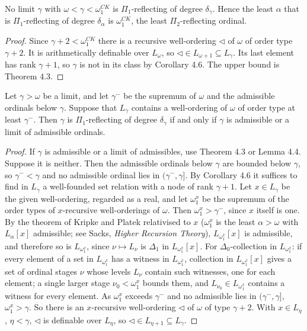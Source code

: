 \documentclass[11pt]{article}
\begin{document}
\begin{statement} No limit $\gamma$ with $\omega < \gamma <
\omega_1^{CK}$ is $\Pi_1$-reflecting of degree $\delta_\gamma$. Hence the least $\alpha$ that is $\Pi_1$-reflecting of
degree $\delta_\alpha$ is $\omega_1^{CK}$, the least $\Pi_2$-reflecting ordinal.
\end{statement}

\begin{proof}
Since $\gamma + 2 < \omega_1^{CK}$ there is a recursive well-ordering $\lhd$ of $\omega$ of order type $\gamma + 2$. It
is arithmetically definable over $L_\omega$, so $\lhd \in L_{\omega+1} \subseteq L_\gamma$. Its last element has rank
$\gamma+1$, so $\gamma$ is not in its class by Corollary 4.6. The upper bound is Theorem 4.3.
\end{proof}

\begin{statement} Let $\gamma > \omega$ be a limit, and let $\gamma^-$
be the supremum of $\omega$ and the admissible ordinals below $\gamma$. Suppose that $L_\gamma$ contains a
well-ordering of $\omega$ of order type at least $\gamma^-$. Then $\gamma$ is $\Pi_1$-reflecting of degree
$\delta_\gamma$ if and only if $\gamma$ is admissible or a limit of admissible ordinals.
\end{statement}

\begin{proof}
If $\gamma$ is admissible or a limit of admissibles, use Theorem 4.3 or Lemma 4.4. Suppose it is neither. Then the
admissible ordinals below $\gamma$ are bounded below $\gamma$, so $\gamma^- < \gamma$ and no admissible ordinal lies in
$(\gamma^-, \gamma]$. By Corollary 4.6 it suffices to find in $L_\gamma$ a well-founded set relation with a node of
rank $\gamma + 1$. Let $x \in L_\gamma$ be the given well-ordering, regarded as a real, and let $\omega_1^x$ be the
supremum of the order types of $x$-recursive well-orderings of $\omega$. Then $\omega_1^x > \gamma^-$, since $x$ itself
is one. By the theorem of Kripke and Platek relativised to $x$ ($\omega_1^x$ is the least $\alpha > \omega$ with
$L_\alpha[x]$ admissible; see Sacks, \emph{Higher Recursion Theory}), $L_{\omega_1^x}[x]$ is admissible, and therefore
so is $L_{\omega_1^x}$, since $\nu \mapsto L_\nu$ is $\Delta_1$ in $L_{\omega_1^x}[x]$. For $\Delta_0$-collection in
$L_{\omega_1^x}$: if every element of a set in $L_{\omega_1^x}$ has a witness in $L_{\omega_1^x}$, collection in
$L_{\omega_1^x}[x]$ gives a set of ordinal stages $\nu$ whose levels $L_\nu$ contain such witnesses, one for each
element; a single larger stage $\nu_0 < \omega_1^x$ bounds them, and $L_{\nu_0} \in L_{\omega_1^x}$ contains a witness
for every element. As $\omega_1^x$ exceeds
$\gamma^-$ and no admissible lies in $(\gamma^-, \gamma]$, $\omega_1^x > \gamma$. So there is an $x$-recursive
well-ordering $\lhd$ of $\omega$ of type $\gamma + 2$. With $x \in L_\eta$, $\eta < \gamma$, $\lhd$ is definable over
$L_\eta$, so $\lhd \in L_{\eta+1} \subseteq L_\gamma$.
\end{proof}
\end{document}
